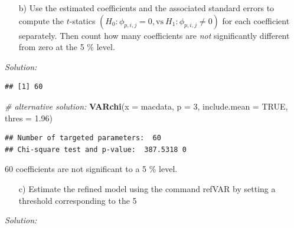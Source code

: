 \documentclass[12pt,a4paper]{article}
\newenvironment{Shaded}{\begin{snugshade}}{\end{snugshade}}
\newcommand{\CommentTok}[1]{\textcolor[rgb]{0.56,0.35,0.01}{\textit{#1}}}
\newcommand{\DataTypeTok}[1]{\textcolor[rgb]{0.13,0.29,0.53}{#1}}
\newcommand{\DecValTok}[1]{\textcolor[rgb]{0.00,0.00,0.81}{#1}}
\newcommand{\FloatTok}[1]{\textcolor[rgb]{0.00,0.00,0.81}{#1}}
\newcommand{\KeywordTok}[1]{\textcolor[rgb]{0.13,0.29,0.53}{\textbf{#1}}}
\newcommand{\NormalTok}[1]{#1}
\newcommand{\OperatorTok}[1]{\textcolor[rgb]{0.81,0.36,0.00}{\textbf{#1}}}
\newcommand{\OtherTok}[1]{\textcolor[rgb]{0.56,0.35,0.01}{#1}}
\newcommand{\StringTok}[1]{\textcolor[rgb]{0.31,0.60,0.02}{#1}}
\begin{document}
\begin{itemize}
  \item[b)] Use the estimated coefficients and the associated standard errors to compute the $t$-statics $(H_0: \phi_{p,i,j} = 0, \text{vs} \ H_1: \phi_{p,i,j} \neq 0)$ for each coefficient separately. Then count how many coefficients are \emph{not} significantly different from zero at the 5 \% level.  
\end{itemize}

\emph{Solution:}

\begin{Shaded}
\end{Shaded}

\begin{verbatim}
## [1] 60
\end{verbatim}

\begin{Shaded}
\begin{Highlighting}[]
\CommentTok{# alternative solution:}
\KeywordTok{VARchi}\NormalTok{(}\DataTypeTok{x =}\NormalTok{ macdata, }\DataTypeTok{p =} \DecValTok{3}\NormalTok{, }\DataTypeTok{include.mean =} \OtherTok{TRUE}\NormalTok{, }\DataTypeTok{thres =} \FloatTok{1.96}\NormalTok{)}
\end{Highlighting}
\end{Shaded}

\begin{verbatim}
## Number of targeted parameters:  60 
## Chi-square test and p-value:  387.5318 0
\end{verbatim}

60 coefficients are not significant to a 5 \% level.

\begin{itemize}
  \item[c)] Estimate the refined model using the command refVAR by setting a threshold corresponding to the 5%
\end{itemize}

\emph{Solution:}
\end{document}
